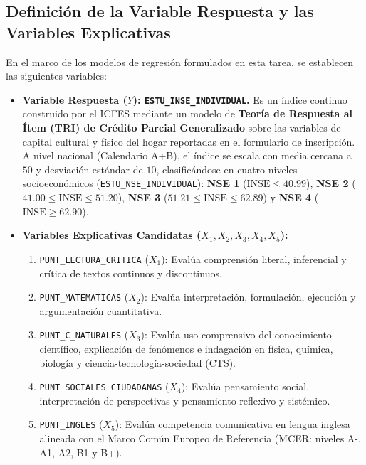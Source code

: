 \documentclass[11pt,letterpaper]{article}
\begin{document}
\subsection{Definición de la Variable Respuesta y las Variables Explicativas}
En el marco de los modelos de regresión formulados en esta tarea, se establecen las siguientes variables:
\begin{itemize}
    \item \textbf{Variable Respuesta ($Y$): \texttt{ESTU\_INSE\_INDIVIDUAL}.} Es un índice continuo construido por el ICFES mediante un modelo de \textbf{Teoría de Respuesta al Ítem (TRI) de Crédito Parcial Generalizado} sobre las variables de capital cultural y físico del hogar reportadas en el formulario de inscripción. A nivel nacional (Calendario A+B), el índice se escala con media cercana a $50$ y desviación estándar de $10$, clasificándose en cuatro niveles socioeconómicos (\texttt{ESTU\_NSE\_INDIVIDUAL}): \textbf{NSE 1} ($\text{INSE} \le 40.99$), \textbf{NSE 2} ($41.00 \le \text{INSE} \le 51.20$), \textbf{NSE 3} ($51.21 \le \text{INSE} \le 62.89$) y \textbf{NSE 4} ($\text{INSE} \ge 62.90$).
    \item \textbf{Variables Explicativas Candidatas ($X_1, X_2, X_3, X_4, X_5$):}
    \begin{enumerate}
        \item \texttt{PUNT\_LECTURA\_CRITICA} ($X_1$): Evalúa comprensión literal, inferencial y crítica de textos continuos y discontinuos.
        \item \texttt{PUNT\_MATEMATICAS} ($X_2$): Evalúa interpretación, formulación, ejecución y argumentación cuantitativa.
        \item \texttt{PUNT\_C\_NATURALES} ($X_3$): Evalúa uso comprensivo del conocimiento científico, explicación de fenómenos e indagación en física, química, biología y ciencia-tecnología-sociedad (CTS).
        \item \texttt{PUNT\_SOCIALES\_CIUDADANAS} ($X_4$): Evalúa pensamiento social, interpretación de perspectivas y pensamiento reflexivo y sistémico.
        \item \texttt{PUNT\_INGLES} ($X_5$): Evalúa competencia comunicativa en lengua inglesa alineada con el Marco Común Europeo de Referencia (MCER: niveles A-, A1, A2, B1 y B+).
    \end{enumerate}
\end{itemize}
\end{document}
